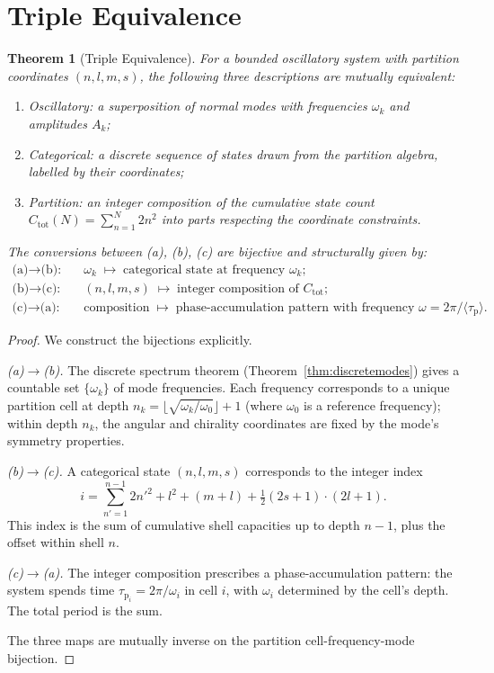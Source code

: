 \documentclass[11pt,a4paper]{article}
\theoremstyle{thmstyle}
\newtheorem{theorem}{Theorem}[section]
\theoremstyle{axiomstyle}
\theoremstyle{definition}
\theoremstyle{remark}
\newcommand{\Lag}{\tau_{\mathrm{p}}}
\begin{document}
\section{Triple Equivalence}
\label{sec:triple}

\begin{theorem}[Triple Equivalence]\label{thm:tripleeq}
For a bounded oscillatory system with partition coordinates $(n,l,m,s)$, the following three descriptions are mutually equivalent:
\begin{enumerate}[label=(\alph*),nosep]
\item \emph{Oscillatory:} a superposition of normal modes with frequencies $\omega_{k}$ and amplitudes $A_{k}$;
\item \emph{Categorical:} a discrete sequence of states drawn from the partition algebra, labelled by their coordinates;
\item \emph{Partition:} an integer composition of the cumulative state count $C_{\mathrm{tot}}(N)=\sum_{n=1}^{N}2n^{2}$ into parts respecting the coordinate constraints.
\end{enumerate}
The conversions between (a), (b), (c) are bijective and structurally given by:
\begin{align}
\text{(a)$\to$(b):} & \quad \omega_{k}\;\mapsto\;\text{categorical state at frequency $\omega_{k}$};\\
\text{(b)$\to$(c):} & \quad (n,l,m,s)\;\mapsto\;\text{integer composition of $C_{\mathrm{tot}}$};\\
\text{(c)$\to$(a):} & \quad \text{composition}\;\mapsto\;\text{phase-accumulation pattern with frequency $\omega=2\pi/\langle\Lag\rangle$}.
\end{align}
\end{theorem}

\begin{proof}
We construct the bijections explicitly.

\emph{(a)$\to$(b).} The discrete spectrum theorem (Theorem~\ref{thm:discretemodes}) gives a countable set $\{\omega_{k}\}$ of mode frequencies. Each frequency corresponds to a unique partition cell at depth $n_{k}=\lfloor\sqrt{\omega_{k}/\omega_{0}}\rfloor+1$ (where $\omega_{0}$ is a reference frequency); within depth $n_{k}$, the angular and chirality coordinates are fixed by the mode's symmetry properties.

\emph{(b)$\to$(c).} A categorical state $(n,l,m,s)$ corresponds to the integer index
\begin{equation}
i=\sum_{n'=1}^{n-1}2n'^{2}+l^{2}+(m+l)+\tfrac{1}{2}(2s+1)\cdot(2l+1).
\end{equation}
This index is the sum of cumulative shell capacities up to depth $n-1$, plus the offset within shell $n$.

\emph{(c)$\to$(a).} The integer composition prescribes a phase-accumulation pattern: the system spends time $\Lag_{i}=2\pi/\omega_{i}$ in cell $i$, with $\omega_{i}$ determined by the cell's depth. The total period is the sum.

The three maps are mutually inverse on the partition cell-frequency-mode bijection.
\end{proof}
\end{document}
